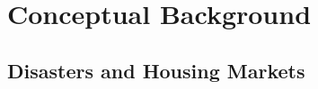 \documentclass[12pt]{article}
\begin{document}
%
%
%
%
\iffalse  %
\section{Conceptual Background}
\label{sec:literature}

\subsection{Disasters and Housing Markets}
\end{document}
